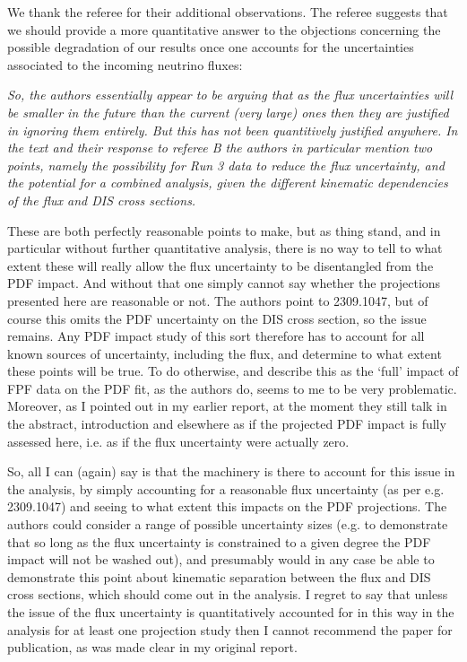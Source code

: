 \documentclass[11pt,a4paper]{article}
\begin{document}
We thank the referee for their additional observations.
%
The referee suggests that we should provide a more quantitative answer to the objections concerning
the possible degradation of our results once one accounts for the uncertainties associated to the incoming neutrino fluxes:\\
	
{\it So, the authors essentially appear to be arguing that as the flux uncertainties will be smaller in the future than the current (very large) ones then they are justified in ignoring them entirely. But this has not been quantitively justified anywhere. In the text and their response to referee B the authors in particular mention two points, namely the possibility for Run 3 data to reduce the flux uncertainty, and the potential for a combined analysis, given the different kinematic dependencies of the flux and DIS cross sections.
  
  These are both perfectly reasonable points to make, but as thing stand, and in particular without further quantitative analysis, there is no way to tell to what extent these will really allow the flux uncertainty to be disentangled from the PDF impact. And without that one simply cannot say whether the projections presented here are reasonable or not. The authors point to 2309.1047, but of course this omits the PDF uncertainty on the DIS cross section, so the issue remains. Any PDF impact study of this sort therefore has to account for all known sources of uncertainty, including the flux, and determine to what extent these points will be true. To do otherwise, and describe this as the ‘full’ impact of FPF data on the PDF fit, as the authors do, seems to me to be very problematic. Moreover, as I pointed out in my earlier report, at the moment they still talk in the abstract, introduction and elsewhere as if the projected PDF impact is fully assessed here, i.e. as if the flux uncertainty were actually zero.
  
  So, all I can (again) say is that the machinery is there to account for this issue in the analysis, by simply accounting for a reasonable flux uncertainty (as per e.g. 2309.1047) and seeing to what extent this impacts on the PDF projections. The authors could consider a range of possible uncertainty sizes (e.g. to demonstrate that so long as the flux uncertainty is constrained to a given degree the PDF impact will not be washed out), and presumably would in any case be able to demonstrate this point about kinematic separation between the flux and DIS cross sections, which should come out in the analysis. I regret to say that unless the issue of the flux uncertainty is quantitatively accounted for in this way in the analysis for at least one projection study then I cannot recommend the paper for publication, as was made clear in my original report.}\\
\end{document}

